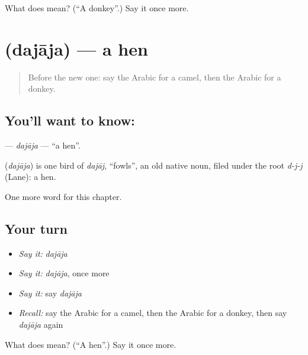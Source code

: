 \begin{tcolorbox}[breakable,colback=teal!4,colframe=teal!35!black,title={Before you move on}]
What does  mean? (\textquotedblleft{}A donkey\textquotedblright{}.) Say it once more.
\end{tcolorbox}
\section[\texorpdfstring{\ar{دجاجة} (dajāja)}{دجاجة (dajāja)}]{ (dajāja) — a hen}

\label{lesson:AR-C81-dajaja}



\begin{quote}
Before the new one: say the Arabic for a camel, then the Arabic for a donkey.
\end{quote}

\subsection*{You'll want to know: }
\textbf{} — \emph{dajāja} — \textquotedblleft{}a hen\textquotedblright{}.

\begin{cousinweb}
\textbf{} (\emph{dajāja}) is one bird of \emph{dajāj}, \textquotedblleft{}fowls\textquotedblright{}, an old native noun, filed under the root \emph{d-j-j} (Lane): a hen.
\end{cousinweb}

\begin{grammarlens}[title={What you've built}]
One more word for this chapter.
\end{grammarlens}

\subsection*{Your turn}
\begin{itemize}
\raggedright
  \item \emph{Say it:} \emph{dajāja}
  \item \emph{Say it:} \emph{dajāja}, once more
  \item \emph{Say it:} say \emph{dajāja}
  \item \emph{Recall:} say the Arabic for a camel, then the Arabic for a donkey, then say \emph{dajāja} again
\end{itemize}

\begin{tcolorbox}[breakable,colback=teal!4,colframe=teal!35!black,title={Before you move on}]
What does  mean? (\textquotedblleft{}A hen\textquotedblright{}.) Say it once more.
\end{tcolorbox}
